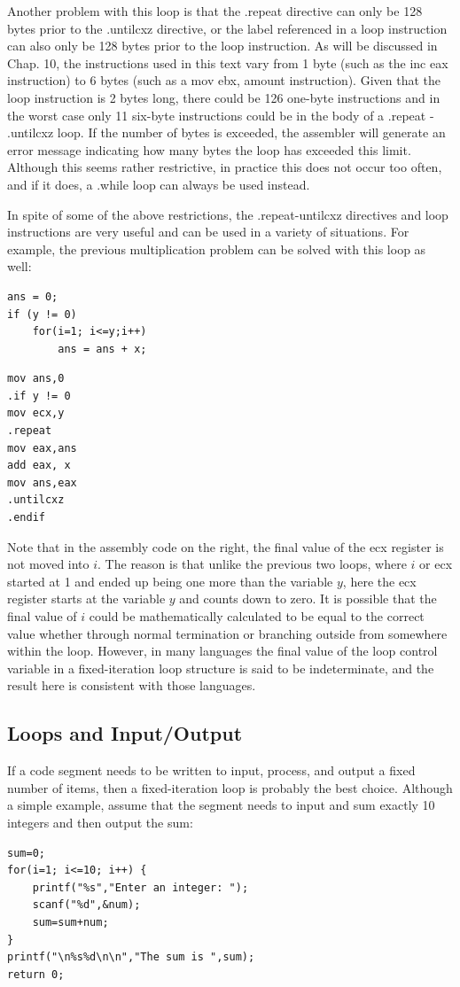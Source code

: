 \documentclass[10pt]{book}
\begin{document}
Another problem with this loop is that the .repeat directive can only be 128 bytes prior to the .untilcxz directive, or the label referenced in a loop instruction can also only be 128 bytes prior to the loop instruction. As will be discussed in Chap. 10, the instructions used in this text vary from 1 byte (such as the inc eax instruction) to 6 bytes (such as a mov ebx, amount instruction). Given that the loop instruction is 2 bytes long, there could be 126 one-byte instructions and in the worst case only 11 six-byte instructions could be in the body of a .repeat - .untilcxz loop. If the number of bytes is exceeded, the assembler will generate an error message indicating how many bytes the loop has exceeded this limit. Although this seems rather restrictive, in practice this does not occur too often, and if it does, a .while loop can always be used instead.

In spite of some of the above restrictions, the .repeat-untilcxz directives and loop instructions are very useful and can be used in a variety of situations. For example, the previous multiplication problem can be solved with this loop as well:

\begin{verbatim}
ans = 0;
if (y != 0)
    for(i=1; i<=y;i++)
        ans = ans + x;
\end{verbatim}

\begin{verbatim}
mov ans,0
.if y != 0
mov ecx,y
.repeat
mov eax,ans
add eax, x
mov ans,eax
.untilcxz
.endif
\end{verbatim}

Note that in the assembly code on the right, the final value of the ecx register is not moved into $i$. The reason is that unlike the previous two loops, where $i$ or ecx started at 1 and ended up being one more than the variable $y$, here the ecx register starts at the variable $y$ and counts down to zero. It is possible that the final value of $i$ could be mathematically calculated to be equal to the correct value whether through normal termination or branching outside from somewhere within the loop. However, in many languages the final value of the loop control variable in a fixed-iteration loop structure is said to be indeterminate, and the result here is consistent with those languages.

\subsection{Loops and Input/Output}
If a code segment needs to be written to input, process, and output a fixed number of items, then a fixed-iteration loop is probably the best choice. Although a simple example, assume that the segment needs to input and sum exactly 10 integers and then output the sum:
\begin{verbatim}
sum=0;
for(i=1; i<=10; i++) {
    printf("%s","Enter an integer: ");
    scanf("%d",&num);
    sum=sum+num;
}
printf("\n%s%d\n\n","The sum is ",sum);
return 0;
\end{verbatim}
\end{document}

